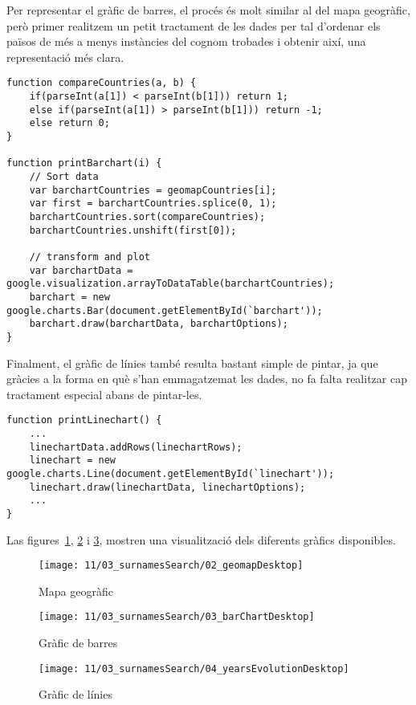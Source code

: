 Per representar el gràfic de barres, el procés és molt similar al del mapa geogràfic, però primer realitzem un petit tractament de les dades per tal d'ordenar els països de més a menys instàncies del cognom trobades i obtenir així, una representació més clara.

\begin{lstlisting}[style=rawOwn,caption={Creació del gràfic de barres}]
function compareCountries(a, b) {
    if(parseInt(a[1]) < parseInt(b[1])) return 1;
    else if(parseInt(a[1]) > parseInt(b[1])) return -1;
    else return 0;
}

function printBarchart(i) {
    // Sort data
    var barchartCountries = geomapCountries[i];
    var first = barchartCountries.splice(0, 1);
    barchartCountries.sort(compareCountries);
    barchartCountries.unshift(first[0]);

    // transform and plot
    var barchartData = google.visualization.arrayToDataTable(barchartCountries);
    barchart = new google.charts.Bar(document.getElementById(`barchart'));
    barchart.draw(barchartData, barchartOptions);
}
\end{lstlisting}

Finalment, el gràfic de línies també resulta bastant simple de pintar, ja que gràcies a la forma en què s’han emmagatzemat les dades, no fa falta realitzar cap tractament especial abans de pintar-les.

\begin{lstlisting}[style=rawOwn,caption={Creació del gràfic de línies}]
function printLinechart() {
    ...
    linechartData.addRows(linechartRows);
    linechart = new google.charts.Line(document.getElementById(`linechart'));
    linechart.draw(linechartData, linechartOptions);
    ...
}
\end{lstlisting}

Las figures~\ref{fig:geomap}, \ref{fig:barchart} i \ref{fig:linechart}, mostren una visualització dels diferents gràfics disponibles.

\begin{figure}[h]
    \texttt{[image: 11/03\_surnamesSearch/02\_geomapDesktop]}
    \centering
    \caption{Mapa geogràfic}\label{fig:geomap}
\end{figure}

\begin{figure}[h]
    \texttt{[image: 11/03\_surnamesSearch/03\_barChartDesktop]}
    \centering
    \caption{Gràfic de barres}\label{fig:barchart}
\end{figure}

\begin{figure}[h]
    \texttt{[image: 11/03\_surnamesSearch/04\_yearsEvolutionDesktop]}
    \centering
    \caption{Gràfic de línies}\label{fig:linechart}
\end{figure}
